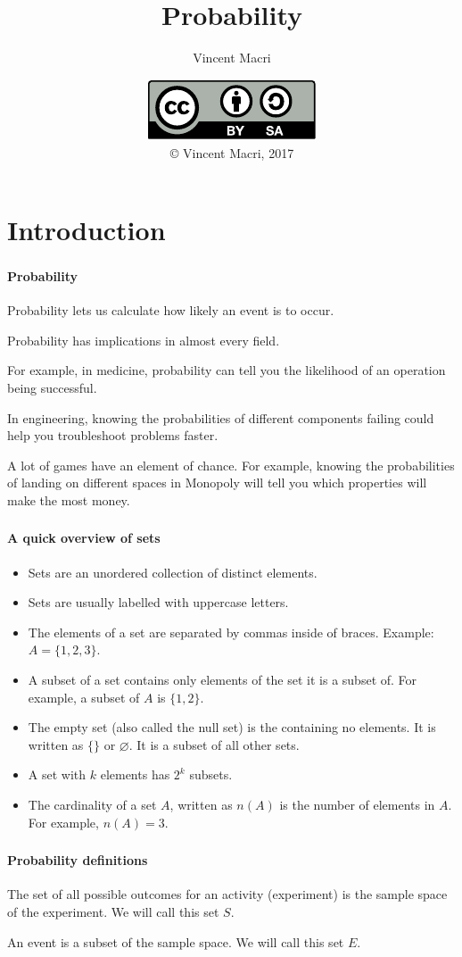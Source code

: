 \documentclass[mathserif]{beamer}
\title{Probability}
\author{Vincent Macri}
\date{\includegraphics{../LicenseLogo}\\\copyright{} Vincent Macri, 2017}
\newenvironment{namedframe}[1]%
	{\begin{frame}\frametitle{\secname}\framesubtitle{#1}}
	{\end{frame}}
\begin{document}
	\frame{\titlepage}
	\section{Introduction}
	\begin{namedframe}{Probability}
		Probability lets us calculate how likely an event is to occur.
		\pause

		Probability has implications in almost every field.  \pause

		For example, in medicine, probability can tell you the likelihood of an operation being successful.
		\pause

		In engineering, knowing the probabilities of different components failing could help you troubleshoot problems faster.
		\pause

		A lot of games have an element of chance. For example, knowing the probabilities of landing on different spaces in Monopoly will tell you which properties will make the most money.
	\end{namedframe}
	\begin{namedframe}{A quick overview of sets}
		\begin{itemize}[<+->]
			\item Sets are an \alert{unordered} collection of \alert{distinct} elements.
			\item Sets are usually labelled with uppercase letters.
			\item The elements of a set are separated by commas inside of braces. Example: $A = \{1,2,3\}$.
			\item A subset of a set contains only elements of the set it is a subset of. For example, a subset of $A$ is $\{1,2\}$.
			\item The empty set (also called the null set) is the containing no elements. It is written as $\{\}$ or $\varnothing$. It is a subset of all other sets.
			\item A set with $k$ elements has $2^k$ subsets.
			\item The cardinality of a set $A$, written as $n(A)$ is the number of elements in $A$. For example, $n(A) = 3$.
		\end{itemize}
	\end{namedframe}
	\begin{namedframe}{Probability definitions}
		\begin{description}[<+->]
			\item[Sample space] The set of all possible outcomes for an activity (experiment) is the sample space of the experiment. We will call this set $S$.
			\item[Event] An event is a subset of the sample space. We will call this set $E$.
		\end{description}
	\end{namedframe}
\end{document}
